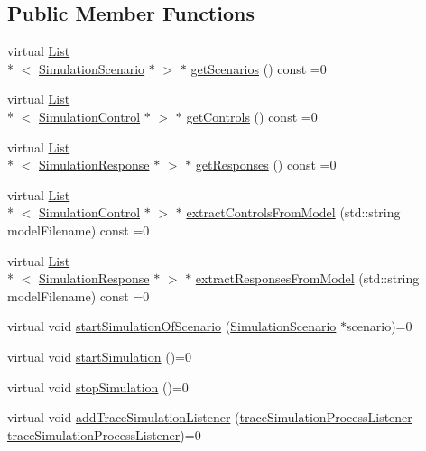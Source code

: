 \subsection*{Public Member Functions}
\begin{DoxyCompactItemize}
\item 
virtual \hyperlink{class_list}{List}\\*
$<$ \hyperlink{class_simulation_scenario}{Simulation\-Scenario} $\ast$ $>$ $\ast$ \hyperlink{class_process_analyser__if_a4cec163a7fc994f7d2cc5d642d3f9b84}{get\-Scenarios} () const =0
\item 
virtual \hyperlink{class_list}{List}\\*
$<$ \hyperlink{class_simulation_control}{Simulation\-Control} $\ast$ $>$ $\ast$ \hyperlink{class_process_analyser__if_a639a16af5f2ad52e63fce4dc751c9fd4}{get\-Controls} () const =0
\item 
virtual \hyperlink{class_list}{List}\\*
$<$ \hyperlink{class_simulation_response}{Simulation\-Response} $\ast$ $>$ $\ast$ \hyperlink{class_process_analyser__if_ab434ec8f01acb7730557f3ff9a460798}{get\-Responses} () const =0
\item 
virtual \hyperlink{class_list}{List}\\*
$<$ \hyperlink{class_simulation_control}{Simulation\-Control} $\ast$ $>$ $\ast$ \hyperlink{class_process_analyser__if_a27b1e534ff72b8faecc28ae7419dd588}{extract\-Controls\-From\-Model} (std\-::string model\-Filename) const =0
\item 
virtual \hyperlink{class_list}{List}\\*
$<$ \hyperlink{class_simulation_response}{Simulation\-Response} $\ast$ $>$ $\ast$ \hyperlink{class_process_analyser__if_a0a13770b90d56f44fe89e4a2e940800e}{extract\-Responses\-From\-Model} (std\-::string model\-Filename) const =0
\item 
virtual void \hyperlink{class_process_analyser__if_a55396a5eb2eebc928eb7681d1f8f87ea}{start\-Simulation\-Of\-Scenario} (\hyperlink{class_simulation_scenario}{Simulation\-Scenario} $\ast$scenario)=0
\item 
virtual void \hyperlink{class_process_analyser__if_ad0949759ce49af24bba3e8875b164675}{start\-Simulation} ()=0
\item 
virtual void \hyperlink{class_process_analyser__if_aeb292cf1587fda460b9d551bfc65c6e4}{stop\-Simulation} ()=0
\item 
virtual void \hyperlink{class_process_analyser__if_abdbb0685841e8366507f77a6884451c3}{add\-Trace\-Simulation\-Listener} (\hyperlink{_trace_manager_8h_a8f5a30615774c5ee0b5c5f86741e4b6f}{trace\-Simulation\-Process\-Listener} \hyperlink{_trace_manager_8h_a8f5a30615774c5ee0b5c5f86741e4b6f}{trace\-Simulation\-Process\-Listener})=0
\end{DoxyCompactItemize}


